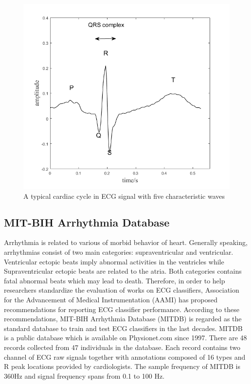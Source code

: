  \begin{figure}[t]
 	\centering
 	\includegraphics[scale=0.75]{Fig/cardiac_cycle.png}
 	\caption{A typical cardiac cycle in ECG signal with five characteristic waves}
 	\label{fig:cardiac_cycle}
 \end{figure}

\subsection{MIT-BIH Arrhythmia Database}

Arrhythmia is related to various of morbid behavior of heart. Generally speaking, arrhythmias consist of two main categories: supraventricular and ventricular. Ventricular ectopic beats imply abnormal activities in the ventricles while Supraventricular ectopic beats are related to the atria. Both categories contains fatal abnormal beats which may lead to death. Therefore, in order to help researchers standardize the evaluation of works on ECG classifiers, Association for the Advancement of Medical Instrumentation (AAMI) \cite{aami} has proposed recommendations for reporting ECG classifier performance. 
According to these recommendations, MIT-BIH Arrhythmia Database (MITDB) is regarded as the standard database to train and test ECG classifiers in the last decades. MITDB is a public database which is available on Physionet.com \cite{physionet} since 1997\cite{mitdb}. There are 48 records collected from 47 individuals in the database. Each record contains two channel of ECG raw signals together with annotations composed of 16 types and R peak locations provided by cardiologists. The sample frequency of MITDB is 360Hz and signal frequency spans from 0.1 to 100 Hz. 

